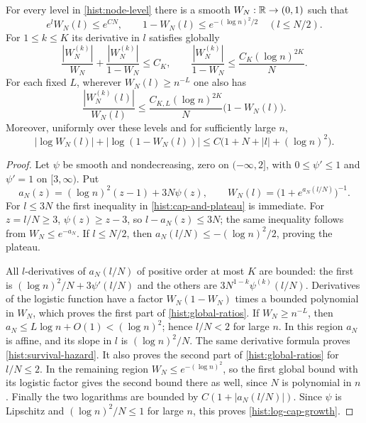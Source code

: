 \begin{lemma}\label{hist:cutoff-hazards}
For every level in \eqref{hist:node-level} there is a smooth
$W_N:\mathbb R\to(0,1)$ such that
\begin{equation}\label{hist:cap-and-plateau}
 e^lW_N(l)\le e^{CN},\qquad
 1-W_N(l)\le e^{-(\log n)^2/2}\quad(l\le N/2).
\end{equation}
For $1\le k\le K$ its derivative in $l$ satisfies globally
\begin{equation}\label{hist:global-ratios}
 \frac{|W_N^{(k)}|}{W_N}+\frac{|W_N^{(k)}|}{1-W_N}\le C_K,
 \qquad
 \frac{|W_N^{(k)}|}{1-W_N}\le\frac{C_K(\log n)^{2K}}N.
\end{equation}
For each fixed $L$, wherever $W_N(l)\ge n^{-L}$ one also has
\begin{equation}\label{hist:survival-hazard}
 \frac{|W_N^{(k)}(l)|}{W_N(l)}
 \le \frac{C_{K,L}(\log n)^{2K}}N\bigl(1-W_N(l)\bigr).
\end{equation}
Moreover, uniformly over these levels and for sufficiently large $n$,
\begin{equation}\label{hist:log-cap-growth}
 |\log W_N(l)|+|\log(1-W_N(l))|
       \le C\bigl(1+N+|l|+(\log n)^2\bigr).
\end{equation}
\end{lemma}

\begin{proof}
Let $\psi$ be smooth and nondecreasing, zero on $(-\infty,2]$, with
$0\le\psi'\le1$ and $\psi'=1$ on $[3,\infty)$.  Put
\[
 a_N(z)=(\log n)^2(z-1)+3N\psi(z),\qquad
 W_N(l)=\bigl(1+e^{a_N(l/N)}\bigr)^{-1}.
\]
For $l\le3N$ the first inequality in \eqref{hist:cap-and-plateau} is
immediate.  For $z=l/N\ge3$, $\psi(z)\ge z-3$, so
$l-a_N(z)\le3N$; the same inequality follows from $W_N\le e^{-a_N}$.
If $l\le N/2$, then $a_N(l/N)\le-(\log n)^2/2$, proving the plateau.

All $l$-derivatives of $a_N(l/N)$ of positive order at most $K$ are bounded:
the first is $(\log n)^2/N+3\psi'(l/N)$ and the others are
$3N^{1-k}\psi^{(k)}(l/N)$.  Derivatives of the logistic function have a
factor $W_N(1-W_N)$ times a bounded polynomial in $W_N$, which proves the
first part of \eqref{hist:global-ratios}.  If $W_N\ge n^{-L}$, then
$a_N\le L\log n+O(1)<(\log n)^2$; hence $l/N<2$ for large $n$.  In this
region $a_N$ is affine, and its slope in $l$ is $(\log n)^2/N$.
The same derivative formula proves \eqref{hist:survival-hazard}.  It also
proves the second part of \eqref{hist:global-ratios} for $l/N\le2$.  In the
remaining region $W_N\le e^{-(\log n)^2}$, so the first global bound with
its logistic factor gives the second bound there as well, since $N$ is
polynomial in $n$.  Finally the two logarithms are bounded by
$C(1+|a_N(l/N)|)$.  Since $\psi$ is Lipschitz and
$(\log n)^2/N\le1$ for large $n$, this proves \eqref{hist:log-cap-growth}.
\end{proof}

